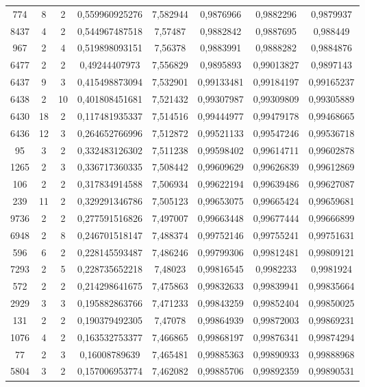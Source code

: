 \begin{longtable}{|c|c|c|c|c|c|c|c|}
774 & 8 & 2 & 0,559960925276 & 7,582944 & 0,9876966 & 0,9882296 & 0,9879937 \\
8437 & 4 & 2 & 0,544967487518 & 7,57487 & 0,9882842 & 0,9887695 & 0,988449 \\
967 & 2 & 4 & 0,519898093151 & 7,56378 & 0,9883991 & 0,9888282 & 0,9884876 \\
6477 & 2 & 2 & 0,49244407973 & 7,556829 & 0,9895893 & 0,99013827 & 0,9897143 \\
6437 & 9 & 3 & 0,415498873094 & 7,532901 & 0,99133481 & 0,99184197 & 0,99165237 \\
6438 & 2 & 10 & 0,401808451681 & 7,521432 & 0,99307987 & 0,99309809 & 0,99305889 \\
6430 & 18 & 2 & 0,117481935337 & 7,514516 & 0,99444977 & 0,99479178 & 0,99468665 \\
6436 & 12 & 3 & 0,264652766996 & 7,512872 & 0,99521133 & 0,99547246 & 0,99536718 \\
95 & 3 & 2 & 0,332483126302 & 7,511238 & 0,99598402 & 0,99614711 & 0,99602878 \\
1265 & 2 & 3 & 0,336717360335 & 7,508442 & 0,99609629 & 0,99626839 & 0,99612869 \\
106 & 2 & 2 & 0,317834914588 & 7,506934 & 0,99622194 & 0,99639486 & 0,99627087 \\
239 & 11 & 2 & 0,329291346786 & 7,505123 & 0,99653075 & 0,99665424 & 0,99659681 \\
9736 & 2 & 2 & 0,277591516826 & 7,497007 & 0,99663448 & 0,99677444 & 0,99666899 \\
6948 & 2 & 8 & 0,246701518147 & 7,488374 & 0,99752146 & 0,99755241 & 0,99751631 \\
596 & 6 & 2 & 0,228145593487 & 7,486246 & 0,99799306 & 0,99812481 & 0,99809121 \\
7293 & 2 & 5 & 0,228735652218 & 7,48023 & 0,99816545 & 0,9982233 & 0,9981924 \\
572 & 2 & 2 & 0,214298641675 & 7,475863 & 0,99832633 & 0,99839941 & 0,99835664 \\
2929 & 3 & 3 & 0,195882863766 & 7,471233 & 0,99843259 & 0,99852404 & 0,99850025 \\
131 & 2 & 2 & 0,190379492305 & 7,47078 & 0,99864939 & 0,99872003 & 0,99869231 \\
1076 & 4 & 2 & 0,163532753377 & 7,466865 & 0,99868197 & 0,99876341 & 0,99874294 \\
77 & 2 & 3 & 0,16008789639 & 7,465481 & 0,99885363 & 0,99890933 & 0,99888968 \\
5804 & 3 & 2 & 0,157006953774 & 7,462082 & 0,99885706 & 0,99892359 & 0,99890531 \\

\end{longtable}
